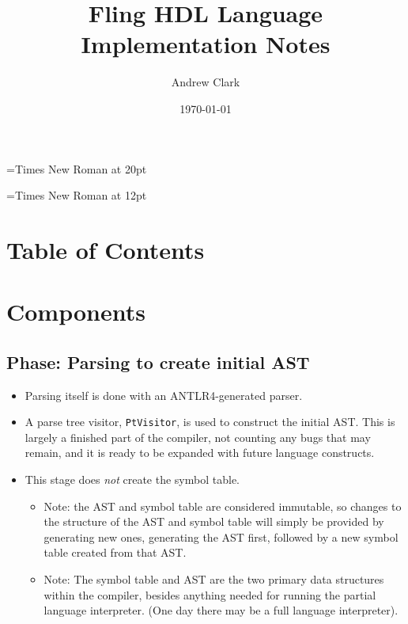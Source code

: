 \documentclass{article}
\makeatletter
\renewcommand\tableofcontents{%
    \@starttoc{toc}%
}
\makeatother
\begin{document}
	\font\titlefont={Times New Roman} at 20pt
	\title{{\titlefont Fling HDL Language Implementation Notes }}

	\font\bottomtextfont={Times New Roman} at 12pt
	\date{{\bottomtextfont} \today}
	\author{{\bottomtextfont Andrew Clark}}

	\setmainfont{Times New Roman}
	\setmonofont{Courier New}

	\maketitle

	\newpage

	\doublespacing


\section{Table of Contents}
	\tableofcontents
	\newpage

\section{Components}
	\subsection{Phase:  Parsing to create initial AST}
		\begin{itemize}
		\item Parsing itself is done with an ANTLR4-generated parser.
		\item A parse tree visitor, \texttt{PtVisitor}, is used to
			construct the initial AST.  This is largely a finished part of
			the compiler, not counting any bugs that may remain, and it is
			ready to be expanded with future language constructs.
		\item This stage does \textit{not} create the symbol table.
			\begin{itemize}
			\item Note:  the AST and symbol table are considered immutable,
				so changes to the structure of the AST and symbol table
				will simply be provided by generating new ones, generating
				the AST first, followed by a new symbol table created from
				that AST.
			\item Note:  The symbol table and AST are the two primary data
				structures within the compiler, besides anything needed for
				running the partial language interpreter.  (One day there
				may be a full language interpreter).
			\end{itemize}
		\end{itemize}
\end{document}
